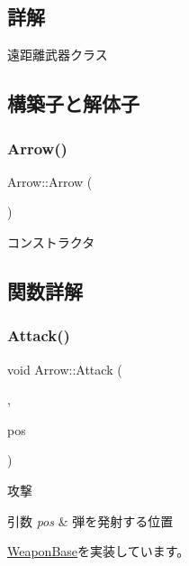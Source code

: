 \subsection{詳解}
遠距離武器クラス 

\subsection{構築子と解体子}
\mbox{\label{class_arrow_a34acd71904bf918ca11ebe9208739a4c}} 
\subsubsection{\texorpdfstring{Arrow()}{Arrow()}}
{\footnotesize\ttfamily Arrow\+::\+Arrow (\begin{DoxyParamCaption}{ }\end{DoxyParamCaption})}



コンストラクタ 



\subsection{関数詳解}
\mbox{\label{class_arrow_ab2571579c0183f4db62bc1c4f9fc68f3}} 
\subsubsection{\texorpdfstring{Attack()}{Attack()}}
{\footnotesize\ttfamily void Arrow\+::\+Attack (\begin{DoxyParamCaption}\item[{bool}]{,  }\item[{const \mbox{\hyperlink{common_8h_afb0c5e21d4133ff4f200992c0b534e1b}{V\+E\+C2}} \&}]{pos }\end{DoxyParamCaption})\hspace{0.3cm}{\ttfamily [virtual]}}



攻撃 


\begin{DoxyParams}{引数}
{\em pos} & 弾を発射する位置 \\
\hline
\end{DoxyParams}


\mbox{\hyperlink{class_weapon_base_a8663cb6d8510d5b3aff1129c575cbd9c}{Weapon\+Base}}を実装しています。

